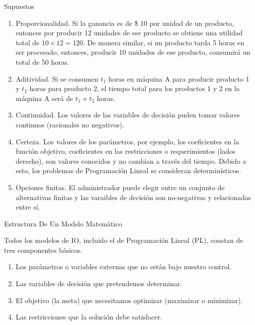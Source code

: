 \documentclass[../main.tex]{subfiles}
\begin{document}
\begin{frame}{Supuestos}
  \begin{enumerate} \parskip3mm \justifying
  \item<only@1> Proporcionalidad. Si la ganancia es de \$ 10 por unidad de un producto, entonces por producir 12 unidades de ese producto se obtiene una utilidad total de $10 \times 12 = 120.$ De manera similar, si un producto tarda 5 horas en ser procesado, entonces, producir 10 unidades de ese producto, consumirá un total de 50 horas. 
  \item<only@1> Aditividad. Si se consumen $t_1$ horas en máquina A para producir producto 1 y $t_2$ horas para producto 2, el tiempo total para los productos 1 y 2 en la máquina A será de $t_1 + t_2$ horas.
  \item<only@1> Continuidad. Los valores de las variables de decisión puden tomar valores continuos (racionales no negativos).
  \item<only@2> Certeza. Los valores de los parámetros, por ejemplo, los coeficientes en la función objetivo, coeficientes en las restricciones o requerimientos (lados derecho), son valores conocidos y no cambian a través del tiempo. Debido a esto, los problemas de Programación Lineal se consideran determinísticos.
  \item<only@2> Opciones finitas. El administrador puede elegir entre un conjunto de alternativas finitas y las varaibles de decisión son no-negativas y relacionadas entre sí.
  \end{enumerate}
\end{frame}



\begin{frame}{Estructura De Un Modelo Matemático}

Todos los modelos de IO, incluido el de Programación Lineal (PL), constan de tres componentes básicos.

  \begin{enumerate} \justifying 
  \item Los \alert{parámetros} o variables externas que no están bajo nuestro control.
  \item Las \alert{variables de decisión} que pretendemos determinar.
  \item El \alert{objetivo} (la meta) que necesitamos optimizar (maximizar o minimizar).
  \item Las \alert{restricciones} que la solución debe satisfacer.
  \end{enumerate}
   
\end{frame}
\end{document}
